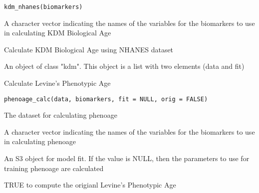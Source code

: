\documentclass[a4paper]{book}
\begin{document}
%
\begin{Usage}
\begin{verbatim}
kdm_nhanes(biomarkers)
\end{verbatim}
\end{Usage}
%
\begin{Arguments}
\begin{ldescription}
\item[\code{biomarkers}] A character vector indicating the names of the variables for the biomarkers to use in calculating KDM Biological Age
\end{ldescription}
\end{Arguments}
%
\begin{Details}\relax
Calculate KDM Biological Age using NHANES dataset
\end{Details}
%
\begin{Value}
An object of class "kdm". This object is a list with two elements (data and fit)
\end{Value}
%
\begin{Examples}
\end{Examples}
%
\begin{Description}\relax
Calculate Levine's Phenotypic Age
\end{Description}
%
\begin{Usage}
\begin{verbatim}
phenoage_calc(data, biomarkers, fit = NULL, orig = FALSE)
\end{verbatim}
\end{Usage}
%
\begin{Arguments}
\begin{ldescription}
\item[\code{data}] The dataset for calculating phenoage

\item[\code{biomarkers}] A character vector indicating the names of the variables for the biomarkers to use in calculating phenoage

\item[\code{fit}] An S3 object for model fit. If the value is NULL, then the parameters to use for training phenoage are calculated

\item[\code{orig}] TRUE to compute the origianl Levine's Phenotypic Age
\end{ldescription}
\end{Arguments}
\end{document}
